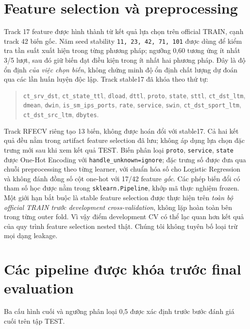\section{Feature selection và preprocessing}
Track 17 feature được hình thành từ kết quả lựa chọn trên official TRAIN, cạnh track 42 biến gốc. Năm seed stability \texttt{11, 23, 42, 71, 101} được dùng để kiểm tra tần suất xuất hiện trong từng phương pháp; ngưỡng 0,60 tương ứng ít nhất 3/5 lượt, sau đó giữ biến đạt điều kiện trong ít nhất hai phương pháp. Đây là độ ổn định \emph{của việc chọn biến}, không chứng minh độ ổn định chất lượng dự đoán qua các lần huấn luyện độc lập. Track stable17 đã khóa theo thứ tự:
\begin{quote}\small\raggedright
\texttt{ct\_srv\_dst}, \texttt{ct\_state\_ttl}, \texttt{dload}, \texttt{dttl},
\texttt{proto}, \texttt{state}, \texttt{sttl}, \texttt{ct\_dst\_ltm},
\texttt{dmean}, \texttt{dwin}, \texttt{is\_sm\_ips\_ports},
\texttt{rate}, \texttt{service}, \texttt{swin},
\texttt{ct\_dst\_sport\_ltm}, \texttt{ct\_dst\_src\_ltm}, \texttt{dbytes}.
\end{quote}
Track RFECV riêng tạo 13 biến, không được hoán đổi với stable17. Cả hai kết quả đều nằm trong artifact feature selection đã lưu; không áp dụng lựa chọn đặc trưng mới sau khi xem kết quả TEST. Biến phân loại \texttt{proto}, \texttt{service}, \texttt{state} được One-Hot Encoding với \texttt{handle\_unknown=ignore}; đặc trưng số được đưa qua chuỗi preprocessing theo từng learner, với chuẩn hóa số cho Logistic Regression và không đánh đồng số cột one-hot với 17/42 feature \emph{gốc}. Các phép biến đổi có tham số học được nằm trong \texttt{sklearn.Pipeline}, khớp mã thực nghiệm frozen. Một giới hạn bắt buộc là stable feature selection được thực hiện trên \emph{toàn bộ official TRAIN trước development cross-validation}, không lặp hoàn toàn bên trong từng outer fold. Vì vậy điểm development CV có thể lạc quan hơn kết quả của quy trình feature selection nested thật. Chúng tôi không tuyên bố loại trừ mọi dạng leakage.

\section{Các pipeline được khóa trước final evaluation}
Ba cấu hình cuối và ngưỡng phân loại 0,5 được xác định trước bước đánh giá cuối trên tập TEST.

